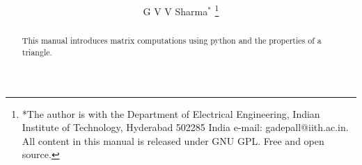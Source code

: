 \documentclass[journal,12pt,twocolumn]{IEEEtran}
\renewcommand\thesection{\arabic{section}}
\begin{document}
\let\StandardTheFigure\thefigure
\renewcommand{\thefigure}{\thesection}



\makeatletter
{}
\makeatother

\let\StandardTheFigure\thefigure
\let\StandardTheTable\thetable
\let\vec\mathbf





\def\putbox#1#2#3{\makebox[0in][l]{\makebox[#1][l]{}\raisebox{\baselineskip}[0in][0in]{\raisebox{#2}[0in][0in]{#3}}}}
     \def\rightbox#1{\makebox[0in][r]{#1}}
     \def\centbox#1{\makebox[0in]{#1}}
     \def\topbox#1{\raisebox{-\baselineskip}[0in][0in]{#1}}
     \def\midbox#1{\raisebox{-0.5\baselineskip}[0in][0in]{#1}}

\vspace{3cm}

\title{ 
}

\author{ G V V Sharma$^{*}$%
	\thanks{*The author is with the Department
		of Electrical Engineering, Indian Institute of Technology, Hyderabad
		502285 India e-mail:  gadepall@iith.ac.in. All content in this manual is released under GNU GPL.  Free and open source.}
	
}	

\maketitle

\tableofcontents

\bigskip

\renewcommand{\thefigure}{\theenumi}
\renewcommand{\thetable}{\theenumi}

\begin{abstract}
This manual introduces matrix computations using python and the properties of a triangle.
\end{abstract}
\end{document}
